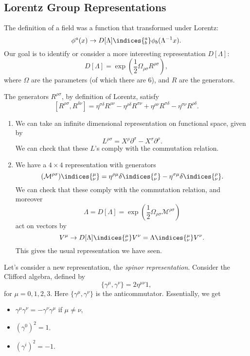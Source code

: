 \documentclass[12pt]{article}
\begin{document}
\subsection{Lorentz Group Representations}%
\label{sub:lgreps}

The definition of a field was a function that transformed under Lorentz:
\[
	\phi^a(x) \to D[\Lambda]\indices{^{a}_{b}} \phi_b (\Lambda^{-1} x).
\]
Our goal is to identify or consider a more interesting representation $D[\Lambda]$:
\[
	D[\Lambda] = \exp \left( \frac 12 \Omega_{\rho\sigma} R^{\rho\sigma} \right),
\]
where $\Omega$ are the parameters (of which there are 6), and $R$ are the generators.

The generators $R^{\rho\sigma}$, by definition of Lorentz, satisfy
\[
	[R^{\rho\sigma}, R^{\delta\nu}] = \eta^{\sigma\delta} R^{\rho\nu} - \eta^{\rho\delta} R^{\sigma\nu} + \eta^{\rho\nu} R^{\sigma\delta} - \eta^{\sigma\nu} R^{\rho\delta}.
\]

\begin{exbox}
	\begin{enumerate}
		\item We can take an infinite dimensional representation on functional space, given by
			\[
			L^{\rho\sigma} = X^{\rho} \partial^{\sigma} - X^{\sigma} \partial^{\rho}.
			\]
			We can check that these $L$'s comply with the commutation relation.
		\item We have a $4 \times 4$ representation with generators
			\[
				(\mathcal{M}^{\rho\sigma})\indices{^{\mu}_{\nu}} = \eta^{\rho\mu} \delta\indices{^{\sigma}_{\nu}}- \eta^{\sigma\mu} \delta\indices{^{\rho}_{\nu}}.
			\]
			We can check that these comply with the commutation relation, and moreover
			\[
				\Lambda = D[\Lambda] = \exp \left( \frac 12 \Omega_{\rho\sigma} \mathcal{M}^{\rho\sigma} \right)
			\]
			act on vectors by
			\[
				V^{\mu} \to D[\Lambda]\indices{^{\mu}_{\nu}} V^{\nu} = \Lambda\indices{^{\mu}_{\nu}} V^{\nu}.
			\]
			This gives the usual representation we have seen.
	\end{enumerate}
\end{exbox}

Let's consider a new representation, the \emph{spinor representation}. Consider the Clifford algebra, defined by
\[
	\{ \gamma^\mu , \gamma^\nu\} = 2\eta^{\mu\nu} 1,
\]
for $\mu = 0, 1, 2, 3$. Here $\{\gamma^\mu, \gamma^{\nu}\}$ is the anticommutator. Essentially, we get
\begin{itemize}
	\item $\gamma^{\mu} \gamma^{\nu} = - \gamma^{\nu} \gamma^{\mu}$ if $\mu \neq \nu$,
	\item $(\gamma^0)^2 = 1$.
	\item $(\gamma^{i})^2 = -1$.
\end{itemize}
\end{document}
